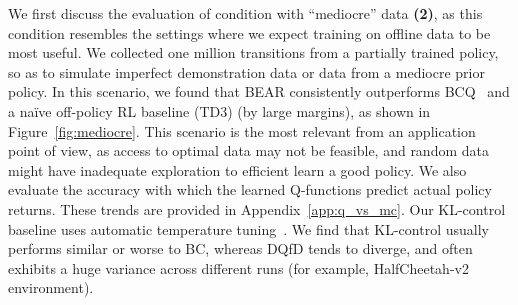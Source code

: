 We first discuss the evaluation of condition with ``mediocre'' data \textbf{(2)}, as this condition resembles the settings where we expect training on offline data to be most useful. We collected one million transitions from a partially trained policy, so as to simulate imperfect demonstration data or data from a mediocre prior policy.
In this scenario, we found that BEAR consistently outperforms BCQ~\cite{fujimoto2018off} and a na\"ive off-policy RL baseline (TD3) (by large margins), as shown in Figure~\ref{fig:mediocre}. This scenario is the most relevant from an application point of view, as access to optimal data may not be feasible, and random data might have inadequate exploration to efficient learn a good policy. We also evaluate the accuracy with which the learned Q-functions predict actual policy returns. These trends are provided in Appendix~\ref{app:q_vs_mc}. 
Our KL-control baseline uses automatic temperature tuning~\citep{haarnoja2018sac}. We find that KL-control usually performs similar or worse to BC, whereas DQfD tends to diverge, and often exhibits a huge variance across different runs (for example, HalfCheetah-v2 environment).  

